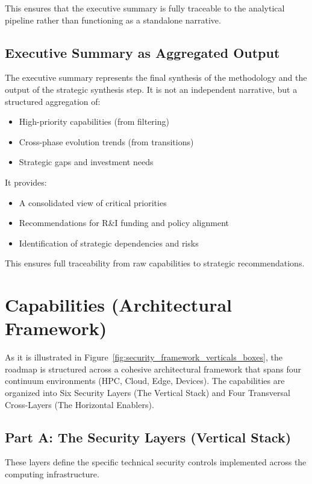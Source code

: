 \documentclass{ieeeaccess}
\begin{document}
This ensures that the executive summary is fully traceable to the analytical pipeline rather than functioning as a standalone narrative.
\subsection{Executive Summary as Aggregated Output}

The executive summary represents the final synthesis of the methodology and the output of the strategic synthesis step. It is not an independent narrative, but a structured aggregation of:

\begin{itemize}
    \item High-priority capabilities (from filtering)
    \item Cross-phase evolution trends (from transitions)
    \item Strategic gaps and investment needs
\end{itemize}

It provides:

\begin{itemize}
    \item A consolidated view of critical priorities
    \item Recommendations for R\&I funding and policy alignment
    \item Identification of strategic dependencies and risks
\end{itemize}

This ensures full traceability from raw capabilities to strategic recommendations.


\newpage
\section{Capabilities (Architectural Framework)}


As it is illustrated in Figure~\ref{fig:security_framework_verticals_boxes}, the roadmap is structured across a cohesive architectural framework that spans four continuum environments (HPC, Cloud, Edge, Devices). The capabilities are organized into Six Security Layers (The Vertical Stack) and Four Transversal Cross-Layers (The Horizontal Enablers).

\subsection*{Part A: The Security Layers (Vertical Stack)}
These layers define the specific technical security controls implemented across the computing infrastructure.
\end{document}
